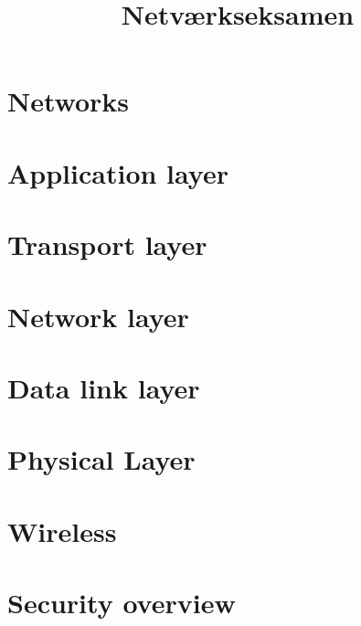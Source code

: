 \documentclass[12pt]{report}
\title{
	{Netværkseksamen}\\
}
\author{

}
\date{

}
\begin{document}
\maketitle

\tableofcontents

\chapter{Networks}


\chapter{Application layer}


\chapter{Transport layer}


\chapter{Network layer}


\chapter{Data link layer}


\chapter{Physical Layer}


\chapter{Wireless}


\chapter{Security overview}

\end{document}
